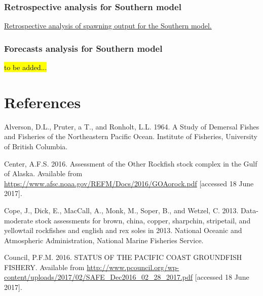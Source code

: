 \documentclass[12pt,]{article}
\begin{document}
\FloatBarrier

\subsubsection{Retrospective analysis for Southern
model}\label{retrospective-analysis-for-southern-model}

\href{Figures/retrospectives/retro.S_compare1_spawnbio.png}{Retrospective
analysis of spawning output for the Southern model. \label{fig:retro.S}}

\subsubsection{Forecasts analysis for Southern
model}\label{forecasts-analysis-for-southern-model}

\hl{to be added...}

\FloatBarrier

\newpage

\color{black}

\section*{References}\label{references}

\renewcommand{\thepage}{}




\newpage

\hypertarget{refs}{}
\hypertarget{ref-Alverson1964}{}
Alverson, D.L., Pruter, a T., and Ronholt, L.L. 1964. A Study of
Demersal Fishes and Fisheries of the Northeastern Pacific Ocean.
Institute of Fisheries, University of British Columbia.

\hypertarget{ref-AFSC2016}{}
Center, A.F.S. 2016. Assessment of the Other Rockfish stock complex in
the Gulf of Alaska. Available from
\url{https://www.afsc.noaa.gov/REFM/Docs/2016/GOAorock.pdf} {[}accessed
18 June 2017{]}.

\hypertarget{ref-Cope2013}{}
Cope, J., Dick, E., MacCall, A., Monk, M., Soper, B., and Wetzel, C.
2013. Data-moderate stock assessments for brown, china, copper,
sharpchin, stripetail, and yellowtail rockfishes and english and rex
soles in 2013. National Oceanic and Atmospheric Administration, National
Marine Fisheries Service.

\hypertarget{ref-PFMC2016}{}
Council, P.F.M. 2016. STATUS OF THE PACIFIC COAST GROUNDFISH FISHERY.
Available from
\url{http://www.pcouncil.org/wp-content/uploads/2017/02/SAFE_Dec2016_02_28_2017.pdf}
{[}accessed 18 June 2017{]}.
\end{document}
